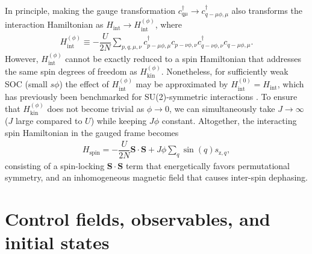 \documentclass[nofootinbib,twocolumn]{revtex4-2}
\renewcommand{\t}{\text} %
\newcommand{\f}[2]{\dfrac{#1}{#2}} %
\newcommand{\p}[1]{\left(#1\right)} %
\renewcommand{\v}{\bm} %
\renewcommand{\c}{\cdot} %
\newcommand{\1}{\mathds{1}}
\newcommand{\z}{\text{z}}
\newcommand{\spin}{\text{spin}}
\begin{document}
In principle, making the gauge transformation $c_{q\mu}^\dag\to c_{q-\mu\phi,\mu}^\dag$ also transforms the interaction Hamiltonian as $H_{\t{int}} \to H_{\t{int}}^{(\phi)}$, where
\begin{align}
  H_{\t{int}}^{(\phi)}
  \equiv -\f{U}{2N} \sum_{p,q,\mu,\nu}
  c_{p-\mu\phi,\mu}^\dag c_{p-\nu\phi,\nu}
  c_{q-\nu\phi,\nu}^\dag c_{q-\mu\phi,\mu}.
\end{align}
However, $H_{\t{int}}^{(\phi)}$ cannot be exactly reduced to a spin Hamiltonian that addresses the same spin degrees of freedom as $H_{\t{kin}}^{(\phi)}$.
Nonetheless, for sufficiently weak SOC (small $s\phi$) the effect of $H_{\t{int}}^{(\phi)}$ may be approximated by $H_{\t{int}}^{(0)}=H_{\t{int}}$, which has previously been benchmarked for SU(2)-symmetric interactions \cite{he2019engineering, smale2019observation}.
To ensure that $H_{\t{kin}}^{(\phi)}$ does not become trivial as $\phi\to0$, we can simultaneously take $J\to\infty$ ($J$ large compared to $U$) while keeping $J\phi$ constant.
Altogether, the interacting spin Hamiltonian in the gauged frame becomes
\begin{align}
  H_\spin = -\f{U}{2N} \v S\c\v S + J\phi \sum_q \sin\p{q} s_{\z,q},
  \label{eq:H_spin}
\end{align}
consisting of a spin-locking $\v S\c\v S$ term that energetically favors permutational symmetry, and an inhomogeneous magnetic field that causes inter-spin dephasing.

\section{Control fields, observables, and initial states}
\label{sec:controls}
\end{document}
